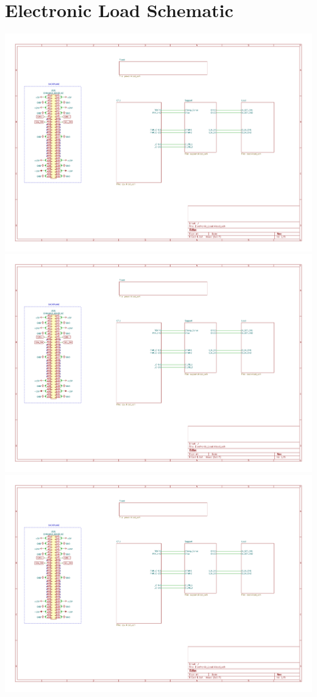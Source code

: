 \documentclass[11pt, a4paper, listof=numbered, captions=tableheading, headinclude, table, xcdraw]{scrreprt}
\begin{document}
\chapter{Electronic Load Schematic}
\includegraphics[page=1,angle=90,width=\textwidth]{schematics/Electronic_Load.pdf}\newpage
\includegraphics[page=2,angle=90,width=\textwidth]{schematics/Electronic_Load.pdf}\newpage
\includegraphics[page=3,angle=90,width=\textwidth]{schematics/Electronic_Load.pdf}\newpage
\end{document}
